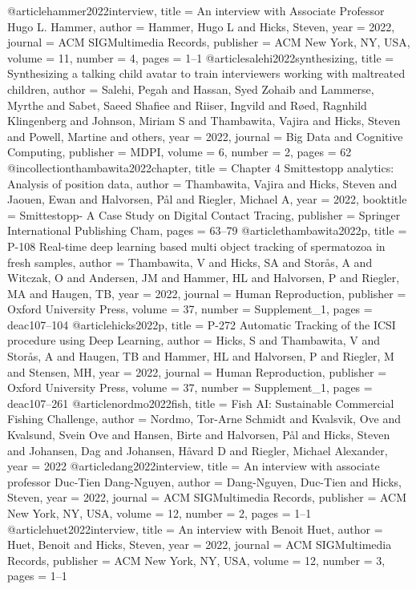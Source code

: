 @article{hammer2022interview,
	title = {An interview with Associate Professor Hugo L. Hammer},
	author = {Hammer, Hugo L and Hicks, Steven},
	year = 2022,
	journal = {ACM SIGMultimedia Records},
	publisher = {ACM New York, NY, USA},
	volume = 11,
	number = 4,
	pages = {1--1}
}
@article{salehi2022synthesizing,
	title = {Synthesizing a talking child avatar to train interviewers working with maltreated children},
	author = {Salehi, Pegah and Hassan, Syed Zohaib and Lammerse, Myrthe and Sabet, Saeed Shafiee and Riiser, Ingvild and R{\o}ed, Ragnhild Klingenberg and Johnson, Miriam S and Thambawita, Vajira and Hicks, Steven and Powell, Martine and others},
	year = 2022,
	journal = {Big Data and Cognitive Computing},
	publisher = {MDPI},
	volume = 6,
	number = 2,
	pages = 62
}
@incollection{thambawita2022chapter,
	title = {Chapter 4 Smittestopp analytics: Analysis of position data},
	author = {Thambawita, Vajira and Hicks, Steven and Jaouen, Ewan and Halvorsen, P{\aa}l and Riegler, Michael A},
	year = 2022,
	booktitle = {Smittestopp- A Case Study on Digital Contact Tracing},
	publisher = {Springer International Publishing Cham},
	pages = {63--79}
}
@article{thambawita2022p,
	title = {P-108 Real-time deep learning based multi object tracking of spermatozoa in fresh samples},
	author = {Thambawita, V and Hicks, SA and Stor{\aa}s, A and Witczak, O and Andersen, JM and Hammer, HL and Halvorsen, P and Riegler, MA and Haugen, TB},
	year = 2022,
	journal = {Human Reproduction},
	publisher = {Oxford University Press},
	volume = 37,
	number = {Supplement\_1},
	pages = {deac107--104}
}
@article{hicks2022p,
	title = {P-272 Automatic Tracking of the ICSI procedure using Deep Learning},
	author = {Hicks, S and Thambawita, V and Stor{\aa}s, A and Haugen, TB and Hammer, HL and Halvorsen, P and Riegler, M and Stensen, MH},
	year = 2022,
	journal = {Human Reproduction},
	publisher = {Oxford University Press},
	volume = 37,
	number = {Supplement\_1},
	pages = {deac107--261}
}
@article{nordmo2022fish,
	title = {Fish AI: Sustainable Commercial Fishing Challenge},
	author = {Nordmo, Tor-Arne Schmidt and Kvalsvik, Ove and Kvalsund, Svein Ove and Hansen, Birte and Halvorsen, P{\aa}l and Hicks, Steven and Johansen, Dag and Johansen, H{\aa}vard D and Riegler, Michael Alexander},
	year = 2022
}
@article{dang2022interview,
	title = {An interview with associate professor Duc-Tien Dang-Nguyen},
	author = {Dang-Nguyen, Duc-Tien and Hicks, Steven},
	year = 2022,
	journal = {ACM SIGMultimedia Records},
	publisher = {ACM New York, NY, USA},
	volume = 12,
	number = 2,
	pages = {1--1}
}
@article{huet2022interview,
	title = {An interview with Benoit Huet},
	author = {Huet, Benoit and Hicks, Steven},
	year = 2022,
	journal = {ACM SIGMultimedia Records},
	publisher = {ACM New York, NY, USA},
	volume = 12,
	number = 3,
	pages = {1--1}
}
